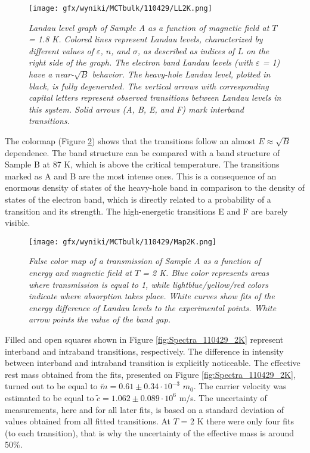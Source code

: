 \documentclass[titlepage,a4paper]{book}
\begin{document}
\begin{figure}[ht]
	\centering
	\texttt{[image: gfx/wyniki/MCTbulk/110429/LL2K.png]}
	\vspace{-10pt}
	\caption{\textit{Landau level graph of Sample A as a function of magnetic field at $T$ = 1.8 K. Colored lines represent Landau levels, characterized by different values of $\varepsilon$, $n$, and $\sigma$, as described as indices of $L$ on the right side of the graph. The electron band Landau levels (with $\varepsilon$ = 1) have a near-$\sqrt{B}$ behavior. The heavy-hole Landau level, plotted in black, is fully degenerated. The vertical arrows with corresponding capital letters represent observed transitions between Landau levels in this system. Solid arrows (A, B, E, and F) mark interband transitions.}}
	\label{fig:LL_110429_2K}
\end{figure}
The colormap (Figure \ref{fig:Map_110429_2K}) shows that the transitions follow an almost $E \approx \sqrt{B}$ dependence. The band structure can be compared with a band structure of Sample B at 87 K, which is above the critical temperature. The transitions marked as A and B are the most intense ones. This is a consequence of an enormous density of states of the heavy-hole band in comparison to the density of states of the electron band, which is directly related to a probability of a transition and its strength. The high-energetic transitions E and F are barely visible.

\begin{figure}[ht]
	\centering
	\texttt{[image: gfx/wyniki/MCTbulk/110429/Map2K.png]}
	\vspace{-10pt}
	\caption{\textit{False color map of a transmission of Sample A as a function of energy and magnetic field at $T$ = 2 K. Blue color represents areas where transmission is equal to 1, while lightblue/yellow/red colors indicate where absorption takes place. White curves show fits of the energy difference of Landau levels to the experimental points. White arrow points the value of the band gap.}}
	\label{fig:Map_110429_2K}
\end{figure} 

Filled and open squares shown in Figure \ref{fig:Spectra_110429_2K} represent interband and intraband transitions, respectively. The difference in intensity between interband and intraband transition is explicitly noticeable. The effective rest mass obtained from the fits, presented on Figure \ref{fig:Spectra_110429_2K}, turned out to be equal to $\tilde m = 0.61 \pm 0.34 \cdot 10^{-3}$ $m_0$. The carrier velocity was estimated to be equal to $\tilde{c} = 1.062 \pm 0.089 \cdot 10^6$ m/s. The uncertainty of measurements, here and for all later fits, is based on a standard deviation of values obtained from all fitted transitions. At $T$ = 2 K there were only four fits (to each transition), that is why the uncertainty of the effective mass is around 50\%.
\end{document}

